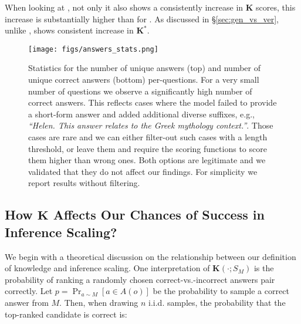 When looking at \baselineD, not only it also shows a consistently increase in $\mathbf{K}$ scores, this increase is substantially higher than for \baselineA. As discussed in \S \ref{sec:gen_vs_ver}, unlike \baselineA, \baselineD shows consistent increase in $\mathbf{K^\ast}$.

\begin{figure*}[t]
 \centering
\texttt{[image: figs/answers\_stats.png]}
    \caption{
    Statistics for the number of unique answers (top) and number of unique correct answers (bottom) per-questions. For a very small number of questions we observe a significantly high number of correct answers. This reflects cases where the model failed to provide a short-form answer and added additional diverse suffixes, e.g., \textit{``Helen. This answer relates to the Greek mythology context.''}. Those cases are rare and we can either filter-out such cases with a length threshold, or leave them and require the scoring functions to score them higher than wrong ones. Both options are legitimate and we validated that they do not affect our findings. For simplicity we report results without filtering.
    }
    \label{fig:answers_stats}    
\end{figure*}


\subsection{How $\mathbf{K}$ Affects Our Chances of Success in Inference Scaling?}
\label{sec:k_vs_inference_scaling}


We begin with a theoretical discussion on the relationship between our definition of knowledge and inference scaling. One interpretation of $\mathbf{K}(\cdot; S_M)$ is the probability of ranking a randomly chosen correct-vs.-incorrect answers pair correctly. Let $p = \Pr_{a \sim M}[a \in A(o)]$ be the probability to sample a correct answer from $M$. Then, when drawing $n$ i.i.d. samples, the probability that the top-ranked candidate is correct is:


